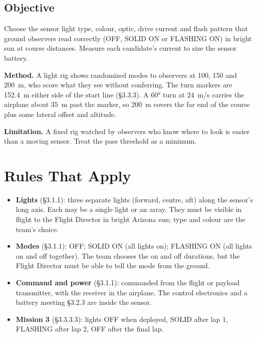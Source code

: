 \documentclass[final]{dbfdoc}
\begin{document}
\begin{frontmatter}
\section{Objective}
\noindent\begin{minipage}[t]{0.62\textwidth}
\setlength\parindent{1.15em}\noindent
Choose the sensor light type, colour, optic, drive current and flash pattern that ground observers read correctly (OFF, SOLID ON or FLASHING ON) in bright sun at course distances. Measure each candidate's current to size the sensor battery.

\noindent\textbf{Method.} A light rig shows randomized modes to observers at 100, 150 and 200~m, who score what they see without conferring. The turn markers are 152.4~m either side of the start line (§3.3.3). A 60° turn at 24~m/s carries the airplane about 35~m past the marker, so 200~m covers the far end of the course plus some lateral offset and altitude.

\noindent\textbf{Limitation.} A fixed rig watched by observers who know where to look is easier than a moving sensor. Treat the pass threshold as a minimum.
\end{minipage}\hfill
\begin{minipage}[t]{0.35\textwidth}
\vspace{-11pt}
\begin{dbfpanel}
\hfill{}\dbfreadoutgap
{}\hfill{}\dbfreadoutgap
{}\hfill{}
\end{dbfpanel}
\end{minipage}
\end{frontmatter}

\section{Rules That Apply}
\begin{itemize}
\item \textbf{Lights} (§3.1.1): three separate lights (forward, centre, aft) along the sensor's long axis. Each may be a single light or an array. They must be visible in flight to the Flight Director in bright Arizona sun; type and colour are the team's choice.
\item \textbf{Modes} (§3.1.1): OFF; SOLID ON (all lights on); FLASHING ON (all lights on and off together). The team chooses the on and off durations, but the Flight Director must be able to tell the mode from the ground.
\item \textbf{Command and power} (§3.1.1): commanded from the flight or payload transmitter, with the receiver in the airplane. The control electronics and a battery meeting §3.2.3 are inside the sensor.
\item \textbf{Mission 3} (§3.3.3.3): lights OFF when deployed, SOLID after lap 1, FLASHING after lap 2, OFF after the final lap.
\end{itemize}
\end{document}
